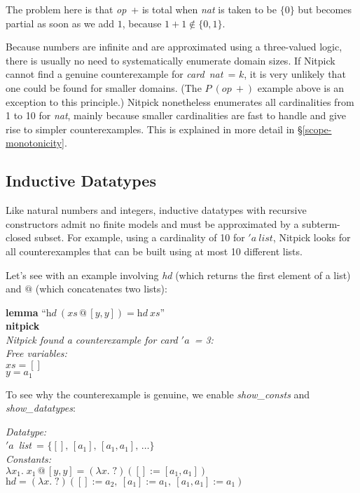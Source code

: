 \documentclass[a4paper,12pt]{article}
\def\unk{{?}}
\def\undef{(\lambda x.\; \unk)}
\def\unr{\ldots}
\begin{document}
The problem here is that \textit{op}~+ is total when \textit{nat} is taken to be
$\{0\}$ but becomes partial as soon as we add $1$, because $1 + 1 \notin \{0,
1\}$.

Because numbers are infinite and are approximated using a three-valued logic,
there is usually no need to systematically enumerate domain sizes. If Nitpick
cannot find a genuine counterexample for \textit{card~nat}~= $k$, it is very
unlikely that one could be found for smaller domains. (The $P~(\textit{op}~{+})$
example above is an exception to this principle.) Nitpick nonetheless enumerates
all cardinalities from 1 to 10 for \textit{nat}, mainly because smaller
cardinalities are fast to handle and give rise to simpler counterexamples. This
is explained in more detail in \S\ref{scope-monotonicity}.

\subsection{Inductive Datatypes}
\label{inductive-datatypes}

Like natural numbers and integers, inductive datatypes with recursive
constructors admit no finite models and must be approximated by a subterm-closed
subset. For example, using a cardinality of 10 for ${'}a~\textit{list}$,
Nitpick looks for all counterexamples that can be built using at most 10
different lists.

Let's see with an example involving \textit{hd} (which returns the first element
of a list) and $@$ (which concatenates two lists):

\prew
\textbf{lemma} ``$\textit{hd}~(\textit{xs} \mathbin{@} [y, y]) = \textit{hd}~\textit{xs}$'' \\
\textbf{nitpick} \\[2\smallskipamount]
\slshape Nitpick found a counterexample for \textit{card} $'a$~= 3: \\[2\smallskipamount]
\hbox{}\qquad Free variables: \nopagebreak \\
\hbox{}\qquad\qquad $\textit{xs} = []$ \\
\hbox{}\qquad\qquad $\textit{y} = a_1$
\postw

To see why the counterexample is genuine, we enable \textit{show\_consts}
and \textit{show\_\allowbreak datatypes}:

\prew
{\slshape Datatype:} \\
\hbox{}\qquad $'a$~\textit{list}~= $\{[],\, [a_1],\, [a_1, a_1],\, \unr\}$ \\
{\slshape Constants:} \\
\hbox{}\qquad $\lambda x_1.\; x_1 \mathbin{@} [y, y] = \undef([] := [a_1, a_1])$ \\
\hbox{}\qquad $\textit{hd} = \undef([] := a_2,\> [a_1] := a_1,\> [a_1, a_1] := a_1)$
\postw
\end{document}
